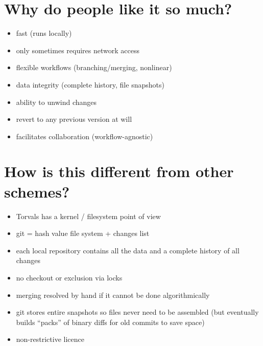 \documentclass[aps,pra,twocolumn,groupaddress,showpacs]{revtex4-1}
\begin{document}
\section{Why do people like it so much?}
\label{SECT:Why-do-people-like-it-so-much}

\begin{itemize}
\item fast (runs locally)
\item only sometimes requires network access
\item flexible workflows (branching/merging, nonlinear)
\item data integrity (complete history, file snapshots)
\item ability to unwind changes
\item revert to any previous version at will
\item facilitates collaboration (workflow-agnostic)
\end{itemize}

\section{How is this different from other schemes?}
\label{SECT:How-is-this-different-from-other-schemes}

\begin{itemize}
\item Torvals has a kernel / filesystem point of view 
\item git = hash value file system + changes list
\item each local repository contains all the data and a complete history of all changes
\item no checkout or exclusion via locks
\item merging resolved by hand if it cannot be done algorithmically
\item git stores entire snapshots so files never need to be assembled (but eventually builds ``packs'' of binary diffs for old commits to save space)
\item non-restrictive licence
\end{itemize}
\end{document}
